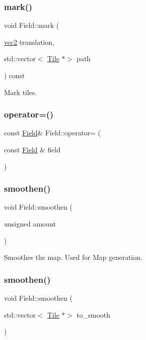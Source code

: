 \subsubsection{\texorpdfstring{mark()}{mark()}}
{\footnotesize\ttfamily void Field\+::mark (\begin{DoxyParamCaption}\item[{\hyperlink{structvec2}{vec2}}]{translation,  }\item[{std\+::vector$<$ \hyperlink{classTile}{Tile} $\ast$$>$}]{path }\end{DoxyParamCaption}) const}

Mark tiles. \mbox{\label{classField_a13d788c1c3d6bba97f3b8d3b6582a814}} 
\subsubsection{\texorpdfstring{operator=()}{operator=()}}
{\footnotesize\ttfamily const \hyperlink{classField}{Field}\& Field\+::operator= (\begin{DoxyParamCaption}\item[{const \hyperlink{classField}{Field} \&}]{field }\end{DoxyParamCaption})\hspace{0.3cm}{\ttfamily [private]}}

\mbox{\label{classField_a7f7717afdf36e1c572743645215b09ad}} 
\subsubsection{\texorpdfstring{smoothen()}{smoothen()}\hspace{0.1cm}{\footnotesize\ttfamily [1/2]}}
{\footnotesize\ttfamily void Field\+::smoothen (\begin{DoxyParamCaption}\item[{unsigned}]{amount }\end{DoxyParamCaption})}

Smoothes the map. Used for Map generation. \mbox{\label{classField_ac4e988bd9aa40e2821d43576907abe81}} 
\subsubsection{\texorpdfstring{smoothen()}{smoothen()}\hspace{0.1cm}{\footnotesize\ttfamily [2/2]}}
{\footnotesize\ttfamily void Field\+::smoothen (\begin{DoxyParamCaption}\item[{std\+::vector$<$ \hyperlink{classTile}{Tile} $\ast$$>$}]{to\+\_\+smooth }\end{DoxyParamCaption})}

